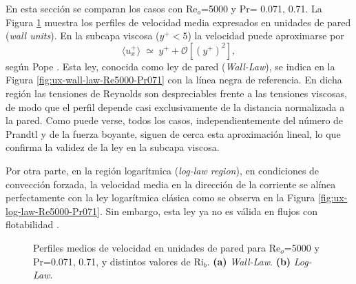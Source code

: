 En esta sección se comparan los casos con Re$_o$=5000 y Pr= 0.071, 0.71. La Figura \ref{fig:ux-plus-Re5000-Pr071} muestra los perfiles de velocidad media expresados en unidades de pared (\textit{wall units}). En la subcapa viscosa ($y^+ < 5$) la velocidad puede aproximarse por
$$\langle u_x^+ \rangle \;\simeq\; y^+ + \mathcal{O} \left[(y^+)^{2} \right],$$
según Pope \cite{pope2001turbulent}. Esta ley, conocida como ley de pared (\textit{Wall-Law}), se indica en la Figura \ref{fig:ux-wall-law-Re5000-Pr071} con la línea negra de referencia. En dicha región las tensiones de Reynolds son despreciables frente a las tensiones viscosas, de modo que el perfil depende casi exclusivamente de la distancia normalizada a la pared. Como puede verse, todos los casos, independientemente del número de Prandtl y de la fuerza boyante, siguen de cerca esta aproximación lineal, lo que confirma la validez de la ley en la subcapa viscosa. 

Por otra parte, en la región logarítmica (\textit{log-law region}), en condiciones de convección forzada, la velocidad media en la dirección de la corriente se alínea perfectamente con la ley logarítmica clásica \cite{kawamura2000dns} como se observa en la Figura \ref{fig:ux-log-law-Re5000-Pr071}. Sin embargo, esta ley ya no es válida en flujos con flotabilidad \cite{zhou2024direct}. 

\begin{figure}[H]
  \centering
    \caption{Perfiles medios de velocidad en unidades de pared para Re$_o$=5000 y Pr=0.071, 0.71, y distintos valores de Ri$_b$. \textbf{(a)} \textit{Wall-Law}. \textbf{(b)} \textit{Log-Law}. }
    \label{fig:ux-plus-Re5000-Pr071}
\end{figure}

